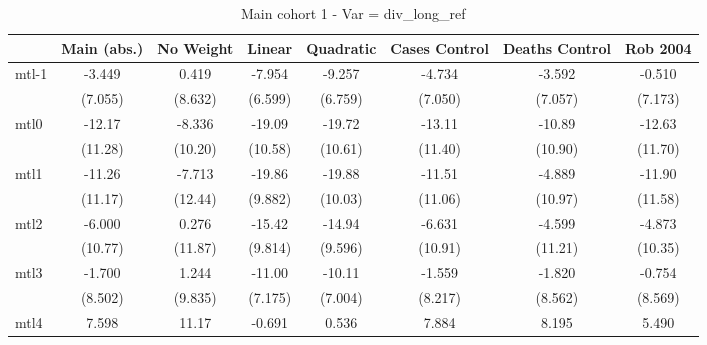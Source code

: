\documentclass{article}
\begin{document}
{
\def\sym#1{\ifmmode^{#1}\else\(^{#1}\)\fi}
\begin{longtable}{l*{7}{c}}
\caption{Main cohort 1 - Var = div\_long\_ref}\\
\hline\hline\endfirsthead\hline\endhead\hline\endfoot\endlastfoot
                &\multicolumn{1}{c}{Main (abs.)}&\multicolumn{1}{c}{No Weight}&\multicolumn{1}{c}{Linear}&\multicolumn{1}{c}{Quadratic}&\multicolumn{1}{c}{Cases Control}&\multicolumn{1}{c}{Deaths Control}&\multicolumn{1}{c}{Rob 2004}\\
\hline
mtl-1           &   -3.449         &    0.419         &   -7.954         &   -9.257         &   -4.734         &   -3.592         &   -0.510         \\
                &  (7.055)         &  (8.632)         &  (6.599)         &  (6.759)         &  (7.050)         &  (7.057)         &  (7.173)         \\
mtl0            &   -12.17         &   -8.336         &   -19.09         &   -19.72         &   -13.11         &   -10.89         &   -12.63         \\
                &  (11.28)         &  (10.20)         &  (10.58)         &  (10.61)         &  (11.40)         &  (10.90)         &  (11.70)         \\
mtl1            &   -11.26         &   -7.713         &   -19.86         &   -19.88         &   -11.51         &   -4.889         &   -11.90         \\
                &  (11.17)         &  (12.44)         &  (9.882)         &  (10.03)         &  (11.06)         &  (10.97)         &  (11.58)         \\
mtl2            &   -6.000         &    0.276         &   -15.42         &   -14.94         &   -6.631         &   -4.599         &   -4.873         \\
                &  (10.77)         &  (11.87)         &  (9.814)         &  (9.596)         &  (10.91)         &  (11.21)         &  (10.35)         \\
mtl3            &   -1.700         &    1.244         &   -11.00         &   -10.11         &   -1.559         &   -1.820         &   -0.754         \\
                &  (8.502)         &  (9.835)         &  (7.175)         &  (7.004)         &  (8.217)         &  (8.562)         &  (8.569)         \\
mtl4            &    7.598         &    11.17         &   -0.691         &    0.536         &    7.884         &    8.195         &    5.490         \\

\end{longtable}}
\end{document}
